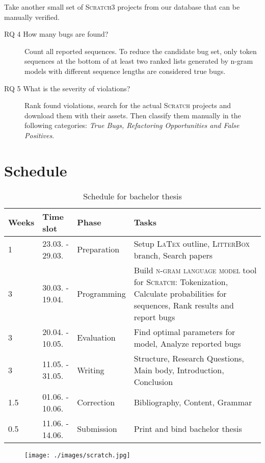 \documentclass[
    numbers=noenddot,
    parskip=half-,
    fontsize=12pt,
    paper=a4,
    oneside,
    titlepage,
    bibliography=totoc,
    chapterprefix=false,
]{scrbook}
\newcommand{\latex}{\textsc{LaTex}}
\newcommand{\ngram}{\textsc{n-gram language model}}
\newcommand{\litterbox}{\textsc{LitterBox}}
\newcommand{\scratch}{\textsc{Scratch}}
\begin{document}
	Take another small set of \scratch{3} projects from our database that can be manually verified.
	
    \begin{description}
        \item[RQ 4 How many bugs are found?] 
        Count all reported sequences. To reduce the candidate bug set, only token sequences at the bottom of at least two ranked lists generated by n-gram models with different sequence lengths are considered true bugs.
        \item[RQ 5 What is the severity of violations?] 
        Rank found violations, search for the actual \scratch{} projects and download them with their assets. Then classify them manually in the following categories: \textit{True Bugs, Refactoring Opportunities and False Positives}.
    \end{description}
 
 
 	\chapter{Schedule}\label{ch:schedule}
 	
 	\begin{table}[ht]
 		\label{tab:schedule}
 		\caption{Schedule for bachelor thesis}
 		\begin{tabular}{p{1cm}p{3cm}p{3cm}p{8cm}}
 			Weeks & Time slot & Phase & Tasks \\
 			\hline
 			1 & 23.03. - 29.03. & Preparation & Setup \latex{} outline, \litterbox{} branch, Search papers \\
 			3 & 30.03. - 19.04. & Programming & Build \ngram{} tool for \scratch{}: Tokenization, Calculate probabilities for sequences, Rank results and report bugs\\
 			3 & 20.04. - 10.05. & Evaluation & Find optimal parameters for model, Analyze reported bugs\\
 			3 & 11.05. - 31.05. & Writing & Structure, Research Questions, Main body, Introduction, Conclusion \\
 			1.5 & 01.06. - 10.06. & Correction & Bibliography, Content, Grammar \\
 			0.5 & 11.06. - 14.06. & Submission & Print and bind bachelor thesis\\
 			\hline
 		\end{tabular}
 	\end{table}
 
 	\begin{figure}
 		\centering
 		\texttt{[image: ./images/scratch.jpg]}
 	\end{figure}


    \backmatter

    \printbibliography
    
\end{document}
